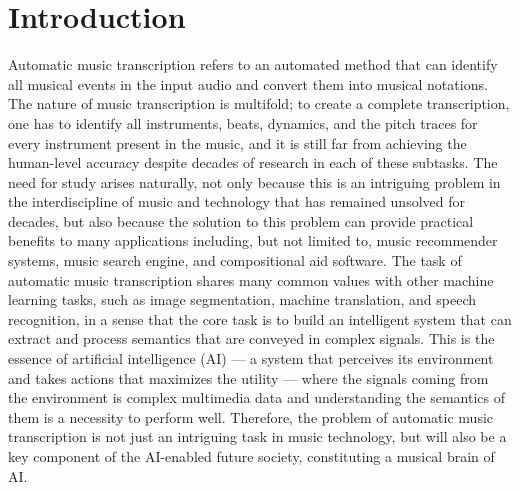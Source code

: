
\graphicspath{{1/figures/}}

\chapter{Introduction}
\label{ch:introduction}

Automatic music transcription refers to an automated method that can identify all musical events in the input audio and convert them into musical notations.
The nature of music transcription is multifold; to create a complete transcription, one has to identify all instruments, beats, dynamics, and the pitch traces for every instrument present in the music, and it is still far from achieving the human-level accuracy despite decades of research in each of these subtasks.
The need for study arises naturally, not only because this is an intriguing problem in the interdiscipline of music and technology that has remained unsolved for decades, but also because the solution to this problem can provide practical benefits to many applications including, but not limited to, music recommender systems, music search engine, and compositional aid software.
The task of automatic music transcription shares many common values with other machine learning tasks, such as image segmentation, machine translation, and speech recognition, in a sense that the core task is to build an intelligent system that can extract and process semantics that are conveyed in complex signals.
This is the essence of artificial intelligence (AI)
--- a system that perceives its environment and takes actions that maximizes the utility \cite{russell2009ai} --- 
where the signals coming from the environment is complex multimedia data and understanding the semantics of them is a necessity to perform well.
Therefore, the problem of automatic music transcription is not just an intriguing task in music technology, but will also be a key component of the AI-enabled future society, constituting a musical brain of AI.


